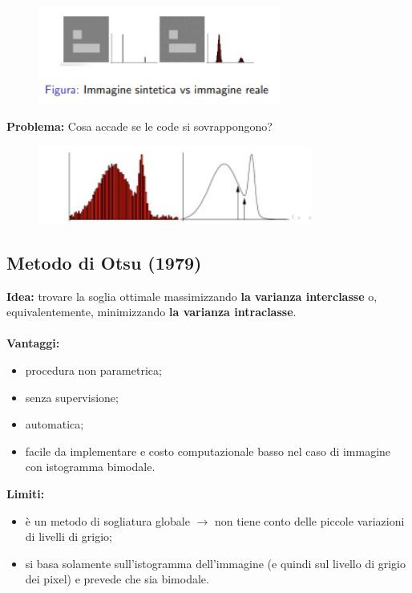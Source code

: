 \begin{figure}[H]
    \centering
    \includegraphics[width=8cm, keepaspectratio]{capitoli/immagini/imgs/trash-automatico-basilare.png}
\end{figure}

\textbf{Problema:} Cosa accade se le code si sovrappongono?

\begin{figure}[H]
    \centering
    \includegraphics[width=9cm, keepaspectratio]{capitoli/immagini/imgs/trash-automatico-basilare2.png}
\end{figure}

\subsection{Metodo di Otsu (1979)}

\textbf{Idea:} trovare la soglia ottimale massimizzando \textbf{la varianza
    interclasse} o, equivalentemente, minimizzando \textbf{la varianza intraclasse}.
\\\\\textbf{Vantaggi:}

\begin{itemize}
    \item procedura non parametrica;
    \item senza supervisione;
    \item automatica;
    \item facile da implementare e costo computazionale basso nel caso di
          immagine con istogramma bimodale.
\end{itemize}

\textbf{Limiti:}

\begin{itemize}
    \item è un metodo di sogliatura globale $\rightarrow$ non tiene conto delle
          piccole variazioni di livelli di grigio;
    \item si basa solamente sull'istogramma dell'immagine (e quindi sul livello
          di grigio dei pixel) e prevede che sia bimodale.
\end{itemize}

